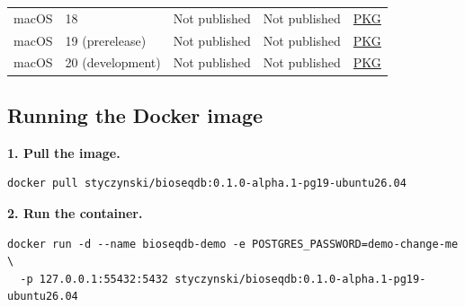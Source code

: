 \begin{longtable}{@{}llccc@{}}
macOS & 18 & Not published & Not published & \href{https://downloads.sourceforge.net/project/bioseqdb/0.1.0-alpha.1/pg18/macos/arm64/657ba47436f713dc/bioseqdb-0.1.0-alpha.1-pg18-macos-arm64.pkg}{PKG} \\
macOS & 19 (prerelease) & Not published & Not published & \href{https://downloads.sourceforge.net/project/bioseqdb/0.1.0-alpha.1/pg19/macos/arm64/300f2135f11e3539/bioseqdb-0.1.0-alpha.1-pg19-macos-arm64.pkg}{PKG} \\
macOS & 20 (development) & Not published & Not published & \href{https://downloads.sourceforge.net/project/bioseqdb/0.1.0-alpha.1/pg20/macos/arm64/54a659966a7afe41/bioseqdb-0.1.0-alpha.1-pg20-macos-arm64.pkg}{PKG} \\
\end{longtable}
\endgroup

\subsection*{Running the Docker image}

\begingroup
\makeatletter
\let\lst@MakeCaption\@gobble
\makeatother
{}

\noindent\textbf{1. Pull the image.}
\begin{lstlisting}[style=resource-shell]
docker pull styczynski/bioseqdb:0.1.0-alpha.1-pg19-ubuntu26.04
\end{lstlisting}

\noindent\textbf{2. Run the container.}
\begin{lstlisting}[style=resource-shell]
docker run -d --name bioseqdb-demo -e POSTGRES_PASSWORD=demo-change-me \
  -p 127.0.0.1:55432:5432 styczynski/bioseqdb:0.1.0-alpha.1-pg19-ubuntu26.04
\end{lstlisting}

